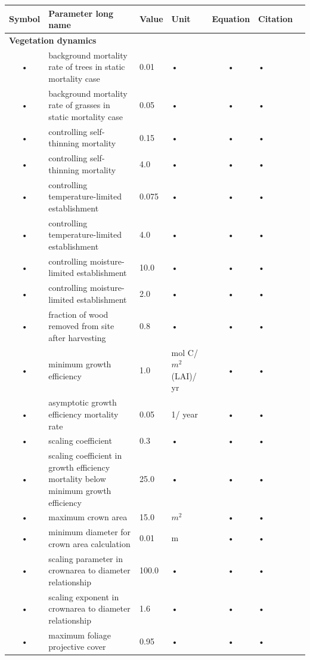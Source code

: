\documentclass[11pt,oneside,openright,a4paper,fleqn]{book}  %
\begin{document}
\begin{table}
\begin{tabularx}{\linewidth}{|c|X|l|l|c|l|c|} %
\hline 
Symbol & Parameter long name & Value & Unit & Equation & Citation \\
\hline 

\multicolumn{6}{l}{\bf Vegetation dynamics}\\
\hline
• & background mortality rate of trees in static mortality case & 0.01 & • & • & • \\
• & background mortality rate of grasses in static mortality case & 0.05 & • & • & • \\
• & controlling self-thinning mortality & 0.15 & • & • & • \\
• & controlling self-thinning mortality & 4.0 & • & • & • \\
• & controlling temperature-limited establishment & 0.075 & • & • & • \\
• & controlling temperature-limited establishment & 4.0 & • & • & • \\
• & controlling moisture-limited establishment & 10.0 & • & • & • \\
• & controlling moisture-limited establishment & 2.0 & • & • & • \\
• & fraction of wood removed from site after harvesting & 0.8 & • & • & • \\
• & minimum growth efficiency & 1.0 & mol C/ $m^2$ (LAI)/ yr & • & • \\
• & asymptotic growth efficiency mortality rate & 0.05 & 1/ year & • & • \\
• & scaling coefficient & 0.3 & • & • & • \\
• & scaling coefficient in growth efficiency mortality below minimum growth efficiency & 25.0 & • & • & • \\
• & maximum crown area & 15.0 & $m^2$ & • & • \\
• & minimum diameter for crown area calculation & 0.01 & m & • & • \\
• & scaling parameter in crownarea to diameter relationship & 100.0 & • & • & • \\
• & scaling exponent in crownarea to diameter relationship & 1.6 & • & • & • \\
• & maximum foliage projective cover & 0.95 & • & • & • \\
\hline 
\end{tabularx}
\end{table}
\end{document}
